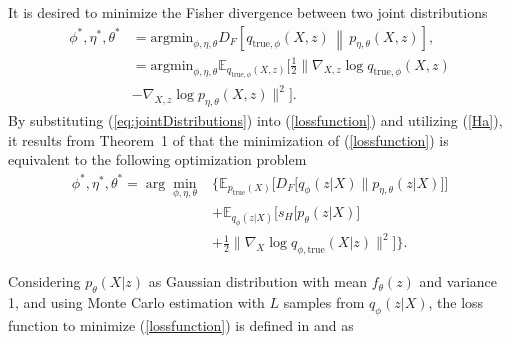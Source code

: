 \documentclass[journal]{IEEEtran}
\begin{document}
It is desired to minimize the Fisher divergence between two joint distributions
\begin{equation} \label{lossfunction}
\begin{aligned}
\phi^*, \eta^*, \theta^* &= \text{argmin}_{\phi, \eta, \theta} {D_{F}} \left[ q_{\text{true},\phi}(X, z) \,\middle\|\, p_{\eta, \theta}(X, z) \right], \\
&=\text{argmin}_{\phi, \eta, \theta}  \mathbb{E}_{q_{\text{true},\phi}(X, z)}[\frac{1}{2} \| \nabla_{X,z} \log q_{\text{true},\phi}(X,z) \\&- \nabla_{X,z} \log p_{\eta,\theta}(X,z) \|^2].
\end{aligned}
\end{equation}
By substituting (\ref{eq:jointDistributions}) into (\ref{lossfunction}) and utilizing (\ref{Ha}), it results from Theorem~1 of \cite{FAE} that the minimization of (\ref{lossfunction}) is equivalent to the following optimization problem
\begin{align}
\phi^*, \eta^*, \theta^* = \arg\min_{\phi,\eta,\theta} & \Bigg\{ \mathbb{E}_{p_{\text{true}}(X)} \Big[ D_{F} \big[ q_{\phi}(z|X) \parallel p_{\eta,\theta}(z|X) \big] \Big] \nonumber \\
& + \mathbb{E}_{q_{\phi}(z|X)} \Big[ s_{H} \big[ p_{\theta}(z|X) \big] \nonumber \\
& + \frac{1}{2} \big\| \nabla_{X} \log q_{\phi,\text{true}}(X|z) \big\|^2 \Big] \Bigg\}.
\end{align}







Considering $p_{\theta}(X|z)$ as Gaussian distribution with mean $f_{\theta}(z)$ and variance 1, and using Monte Carlo estimation with $L$ samples from $q_{\phi}(z|X)$, the loss function to minimize (\ref{lossfunction}) is defined in  \cite{FAE} and \cite{FAE2} as
\end{document}

